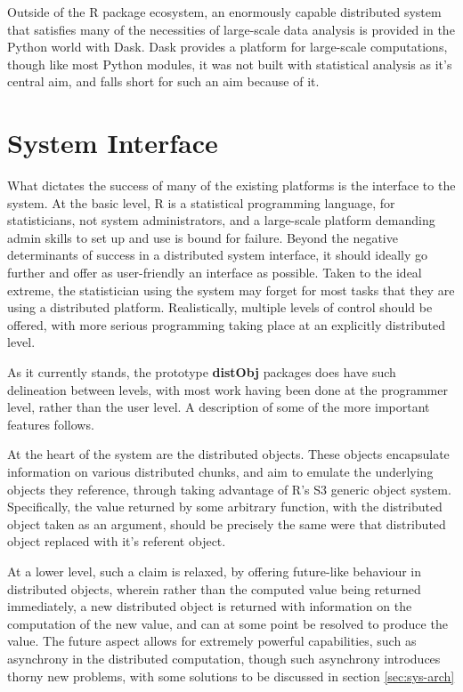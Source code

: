 \documentclass[a4paper,10pt]{article}
\begin{document}
Outside of the R package ecosystem, an enormously capable distributed system
that satisfies many of the necessities of large-scale data analysis is provided
in the Python world with Dask\cite{rocklin2015dask}.
Dask provides a platform for large-scale computations, though like most Python
modules, it was not built with statistical analysis as it's central aim, and
falls short for such an aim because of it.

\section{System Interface}

What dictates the success of many of the existing platforms is the interface to
the system.
At the basic level, R is a statistical programming language, for statisticians,
not system administrators, and a large-scale platform demanding admin skills to
set up and use is bound for failure.
Beyond the negative determinants of success in a distributed system interface,
it should ideally go further and offer as user-friendly an interface as
possible.
Taken to the ideal extreme, the statistician using the system may forget for
most tasks that they are using a distributed platform.
Realistically, multiple levels of control should be offered, with more serious
programming taking place at an explicitly distributed level.

As it currently stands, the prototype \textbf{distObj} packages does have such
delineation between levels, with most work having been done at the programmer
level, rather than the user level.
A description of some of the more important features follows.

At the heart of the system are the distributed objects.
These objects encapsulate information on various distributed chunks, and aim to
emulate the underlying objects they reference, through taking advantage of R's
S3 generic object system.
Specifically, the value returned by some arbitrary function, with the
distributed object taken as an argument, should be precisely the same were that
distributed object replaced with it's referent object.

At a lower level, such a claim is relaxed, by offering future-like behaviour in
distributed objects, wherein rather than the computed value being returned
immediately, a new distributed object is returned with information on the
computation of the new value, and can at some point be resolved to produce the
value.
The future aspect allows for extremely powerful capabilities, such as
asynchrony in the distributed computation, though such asynchrony introduces
thorny new problems, with some solutions to be discussed in section
\ref{sec:sys-arch}
\end{document}
